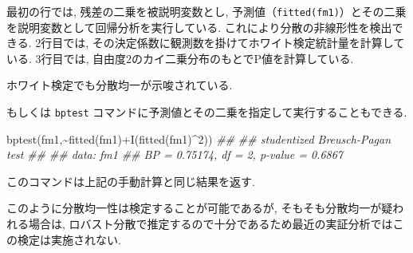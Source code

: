 \documentclass[
  letterpaper,
  xelatex,
  ja=standard, xelatex]{bxjsbook}
\newenvironment{Shaded}{\begin{snugshade}}{\end{snugshade}}
\newcommand{\AttributeTok}[1]{\textcolor[rgb]{0.40,0.45,0.13}{#1}}
\newcommand{\DecValTok}[1]{\textcolor[rgb]{0.68,0.00,0.00}{#1}}
\newcommand{\DocumentationTok}[1]{\textcolor[rgb]{0.37,0.37,0.37}{\textit{#1}}}
\newcommand{\FunctionTok}[1]{\textcolor[rgb]{0.28,0.35,0.67}{#1}}
\newcommand{\NormalTok}[1]{\textcolor[rgb]{0.00,0.23,0.31}{#1}}
\newcommand{\OtherTok}[1]{\textcolor[rgb]{0.00,0.23,0.31}{#1}}
\newcommand{\SpecialCharTok}[1]{\textcolor[rgb]{0.37,0.37,0.37}{#1}}
\begin{document}
\begin{Shaded}
\end{Shaded}

最初の行では, 残差の二乗を被説明変数とし,
予測値（\texttt{fitted(fm1)}）とその二乗を説明変数として回帰分析を実行している.
これにより分散の非線形性を検出できる. 2行目では,
その決定係数に観測数を掛けてホワイト検定統計量を計算している. 3行目では,
自由度2のカイ二乗分布のもとでP値を計算している.

ホワイト検定でも分散均一が示唆されている.

もしくは \texttt{bptest}
コマンドに予測値とその二乗を指定して実行することもできる.

\begin{Shaded}
\begin{Highlighting}[]
\FunctionTok{bptest}\NormalTok{(fm1,}\SpecialCharTok{\textasciitilde{}}\FunctionTok{fitted}\NormalTok{(fm1)}\SpecialCharTok{+}\FunctionTok{I}\NormalTok{(}\FunctionTok{fitted}\NormalTok{(fm1)}\SpecialCharTok{\^{}}\DecValTok{2}\NormalTok{))}
\DocumentationTok{\#\# }
\DocumentationTok{\#\#  studentized Breusch{-}Pagan test}
\DocumentationTok{\#\# }
\DocumentationTok{\#\# data:  fm1}
\DocumentationTok{\#\# BP = 0.75174, df = 2, p{-}value = 0.6867}
\end{Highlighting}
\end{Shaded}

このコマンドは上記の手動計算と同じ結果を返す.

このように分散均一性は検定することが可能であるが,
そもそも分散均一が疑われる場合は,
ロバスト分散で推定するので十分であるため最近の実証分析ではこの検定は実施されない.
\end{document}
